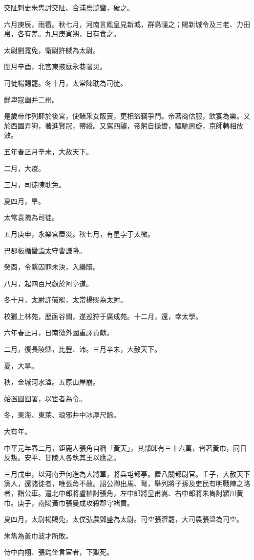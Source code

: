 \begin{pinyinscope}
交阯刺史朱雋討交阯、合浦烏滸蠻，破之。

六月庚辰，雨雹。秋七月，河南言鳳皇見新城，群鳥隨之；賜新城令及三老、力田帛，各有差。九月庚寅朔，日有食之。

太尉劉寬免，衛尉許戫為太尉。

閏月辛酉，北宮東掖庭永巷署災。

司徒楊賜罷。冬十月，太常陳耽為司徒。

鮮卑寇幽并二州。

是歲帝作列肆於後宮，使諸釆女販賣，更相盜竊爭鬥。帝著商估服，飲宴為樂。又於西園弄狗，著進賢冠，帶綬。又駕四驢，帝躬自操轡，驅馳周旋，京師轉相放效。

五年春正月辛未，大赦天下。

二月，大疫。

三月，司徒陳耽免。

夏四月，旱。

太常袁隗為司徒。

五月庚申，永樂宮置災。秋七月，有星孛于太微。

巴郡板楯蠻詣太守曹謙降。

癸酉，令繫囚罪未決，入縑贖。

八月，起四百尺觀於阿亭道。

冬十月，太尉許戫罷，太常楊賜為太尉。

校獵上林苑，歷函谷關，遂巡狩于廣成苑。十二月，還，幸太學。

六年春正月，日南徼外國重譯貢獻。

二月，復長陵縣，比豐、沛。三月辛未，大赦天下。

夏，大旱。

秋，金城河水溢。五原山岸崩。

始置圃囿署，以宦者為令。

冬，東海、東萊、琅邪井中冰厚尺餘。

大有年。

中平元年春二月，鉅鹿人張角自稱「黃天」，其部師有三十六萬，皆著黃巾，同日反叛。安平、甘陵人各執其王以應之。

三月戊申，以河南尹何進為大將軍，將兵屯都亭。置八關都尉官。壬子，大赦天下黨人，還諸徙者，唯張角不赦。詔公卿出馬、弩，舉列將子孫及吏民有明戰陣之略者，詣公車。遣北中郎將盧植討張角，左中郎將皇甫嵩、右中郎將朱雋討潁川黃巾。庚子，南陽黃巾張曼成攻殺郡守褚貢。

夏四月，太尉楊賜免，太僕弘農鄧盛為太尉。司空張濟罷，大司農張溫為司空。

朱雋為黃巾波才所敗。

侍中向栩、張鈞坐言宦者，下獄死。


\end{pinyinscope}
